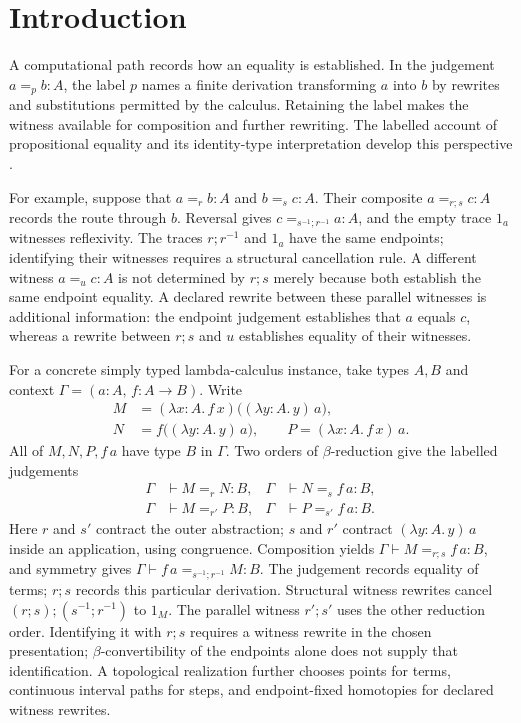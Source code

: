 \documentclass[10pt,reqno]{amsart}
\theoremstyle{definition}
\theoremstyle{plain}
\theoremstyle{remark}
\begin{document}
\section{Introduction}
\label{sec:introduction}
A computational path records how an equality is established. In the judgement
$a =_p b : A$, the label $p$ names a finite derivation transforming $a$ into
$b$ by rewrites and substitutions permitted by the calculus. Retaining the
label makes the witness available for composition and further rewriting.
The labelled account of propositional equality and its identity-type
interpretation develop this perspective
\cite{RamosDeQueirozDeOliveira2016propositional,Ramos2017identity}.

For example, suppose that $a =_r b : A$ and $b =_s c : A$. Their composite
$a =_{r;s} c : A$ records the route through $b$. Reversal gives
$c =_{s^{-1};r^{-1}} a : A$, and the empty trace $1_a$ witnesses reflexivity.
The traces $r;r^{-1}$ and $1_a$ have the same endpoints; identifying their
witnesses requires a structural cancellation rule. A different witness
$a =_u c : A$ is not determined by $r;s$ merely because both establish the
same endpoint equality. A declared rewrite between these parallel witnesses
is additional information: the endpoint judgement establishes that $a$ equals $c$,
whereas a rewrite between $r;s$ and $u$ establishes equality of their witnesses.

For a concrete simply typed lambda-calculus instance, take types $A,B$ and
context $\Gamma=(a:A,\,f:A\to B)$. Write
\[
\begin{aligned}
 M&=(\lambda x:A.\,f\,x)\bigl((\lambda y:A.\,y)\,a\bigr),\\
 N&=f\bigl((\lambda y:A.\,y)\,a\bigr),
 \qquad P=(\lambda x:A.\,f\,x)\,a.
\end{aligned}
\]
All of $M,N,P,f\,a$ have type $B$ in $\Gamma$. Two orders of
$\beta$-reduction give the labelled judgements
\[
\begin{aligned}
 \Gamma&\vdash M =_r N:B,
 &\Gamma&\vdash N =_s f\,a:B,\\
 \Gamma&\vdash M =_{r'} P:B,
 &\Gamma&\vdash P =_{s'} f\,a:B.
\end{aligned}
\]
Here $r$ and $s'$ contract the outer abstraction; $s$ and $r'$ contract
$(\lambda y:A.\,y)\,a$ inside an application, using congruence.
Composition yields $\Gamma\vdash M =_{r;s} f\,a:B$, and symmetry gives
$\Gamma\vdash f\,a =_{s^{-1};r^{-1}} M:B$.
The judgement records equality of terms; $r;s$ records this particular
derivation. Structural witness rewrites cancel
$(r;s);(s^{-1};r^{-1})$ to $1_M$. The parallel witness $r';s'$ uses
the other reduction order. Identifying it with $r;s$ requires a witness
rewrite in the chosen presentation; $\beta$-convertibility of the endpoints
alone does not supply that identification. A topological realization further
chooses points for terms, continuous interval paths for steps, and
endpoint-fixed homotopies for declared witness rewrites.
\end{document}

